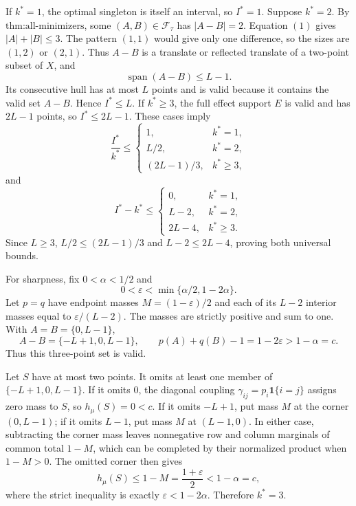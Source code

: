 If \(k^*=1\), the optimal singleton is itself an interval, so \(I^*=1\).  Suppose \(k^*=2\).  By \(\text{thm:all-minimizers}\), some \((A,B)\in\mathcal F_{\tau}\) has \(|A-B|=2\).  Equation \((1)\) gives \(|A|+|B|\leq3\).  The pattern \((1,1)\) would give only one difference, so the sizes are \((1,2)\) or \((2,1)\).  Thus \(A-B\) is a translate or reflected translate of a two-point subset of \(X\), and
\[
\operatorname{span}(A-B)\leq L-1.
\]
Its consecutive hull has at most \(L\) points and is valid because it contains the valid set \(A-B\).  Hence \(I^*\leq L\).  If \(k^*\geq3\), the full effect support \(E\) is valid and has \(2L-1\) points, so \(I^*\leq2L-1\).  These cases imply
\[
\frac{I^*}{k^*}\leq
\begin{cases}
1,&k^*=1,\\
L/2,&k^*=2,\\
(2L-1)/3,&k^*\geq3,
\end{cases}
\]
and
\[
I^*-k^*\leq
\begin{cases}
0,&k^*=1,\\
L-2,&k^*=2,\\
2L-4,&k^*\geq3.
\end{cases}
\]
Since \(L\geq3\), \(L/2\leq(2L-1)/3\) and \(L-2\leq2L-4\), proving both universal bounds.

For sharpness, fix \(0<\alpha<1/2\) and
\[
0<\varepsilon<\min\{\alpha/2,1-2\alpha\}.
\]
Let \(p=q\) have endpoint masses \(M=(1-\varepsilon)/2\) and each of its \(L-2\) interior masses equal to \(\varepsilon/(L-2)\).  The masses are strictly positive and sum to one.  With \(A=B=\{0,L-1\}\),
\[
A-B=\{-L+1,0,L-1\},
\qquad
p(A)+q(B)-1=1-2\varepsilon>1-\alpha=c.
\]
Thus this three-point set is valid.

Let \(S\) have at most two points.  It omits at least one member of \(\{-L+1,0,L-1\}\).  If it omits \(0\), the diagonal coupling \(\gamma_{ij}=p_i\mathbf 1\{i=j\}\) assigns zero mass to \(S\), so \(h_{\mu}(S)=0<c\).  If it omits \(-L+1\), put mass \(M\) at the corner \((0,L-1)\); if it omits \(L-1\), put mass \(M\) at \((L-1,0)\).  In either case, subtracting the corner mass leaves nonnegative row and column marginals of common total \(1-M\), which can be completed by their normalized product when \(1-M>0\).  The omitted corner then gives
\[
h_{\mu}(S)\leq1-M=\frac{1+\varepsilon}{2}<1-\alpha=c,
\]
where the strict inequality is exactly \(\varepsilon<1-2\alpha\).  Therefore \(k^*=3\).

